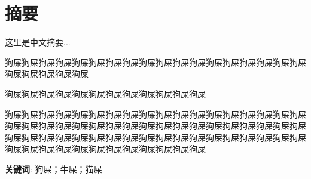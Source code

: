 \section*{ 摘要}
这里是中文摘要...

狗屎狗屎狗屎狗屎狗屎狗屎狗屎狗屎狗屎狗屎狗屎狗屎狗屎狗屎狗屎狗屎狗屎狗屎狗屎狗屎狗屎狗屎狗屎

狗屎狗屎狗屎狗屎狗屎狗屎狗屎狗屎狗屎狗屎狗屎狗屎

狗屎狗屎狗屎狗屎狗屎狗屎狗屎狗屎狗屎狗屎狗屎狗屎狗屎狗屎狗屎狗屎狗屎狗屎狗屎狗屎狗屎狗屎狗屎狗屎狗屎狗屎狗屎狗屎狗屎狗屎狗屎狗屎狗屎狗屎狗屎狗屎狗屎狗屎狗屎狗屎狗屎狗屎狗屎狗屎狗屎狗屎狗屎狗屎狗屎狗屎狗屎狗屎狗屎狗屎狗屎狗屎狗屎狗屎狗屎狗屎狗屎狗屎狗屎狗屎狗屎狗屎

\noindent
\textbf{关键词}:
狗屎；牛屎；猫屎
\indent 
 